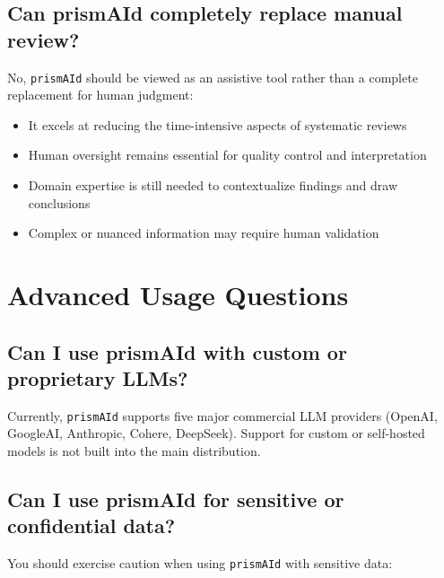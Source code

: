 \subsection{Can prismAId completely replace manual review?}

No, \texttt{prismAId} should be viewed as an assistive tool rather than a complete replacement for human judgment:

\begin{itemize}
    \item It excels at reducing the time-intensive aspects of systematic reviews
    \item Human oversight remains essential for quality control and interpretation
    \item Domain expertise is still needed to contextualize findings and draw conclusions
    \item Complex or nuanced information may require human validation
\end{itemize}


\section{Advanced Usage Questions}

\subsection{Can I use prismAId with custom or proprietary LLMs?}

Currently, \texttt{prismAId} supports five major commercial LLM providers (OpenAI, GoogleAI, Anthropic, Cohere, DeepSeek). Support for custom or self-hosted models is not built into the main distribution.


\subsection{Can I use prismAId for sensitive or confidential data?}

You should exercise caution when using \texttt{prismAId} with sensitive data:

